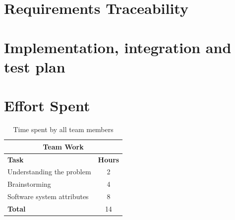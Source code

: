 \documentclass{article}
\begin{document}
	\clearpage	
	\section{Requirements Traceability}
	\clearpage	
	\section{Implementation, integration and test plan}
	
	\clearpage
	\section{Effort Spent}
		\begin{table}[h]
			\centering
			\begin{tabular}{l c}
				\hline\hline
				\multicolumn{2}{c}{\textbf{Team Work}} \\
				\hline
				\textbf{Task} & \textbf{Hours} \\ [0.5ex]
				\hline
				Understanding the problem & 2  \\
				Brainstorming & 4 \\
				Software system attributes & 8 \\
				\hline
				\textbf{Total} & 14  \\
				\hline
			\end{tabular}
			\caption{Time spent by all team members}
			\label{fig:Time spent by all team members}
		\end{table}
		
\end{document}
